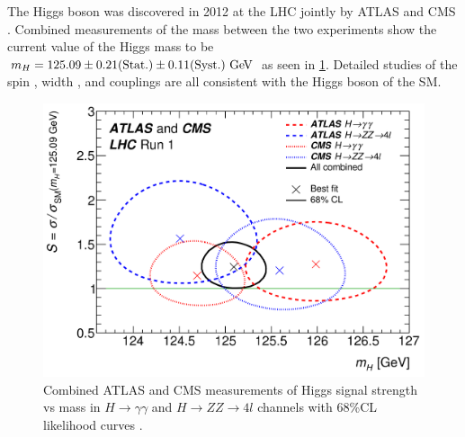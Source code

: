 

The Higgs boson was discovered in 2012 at the LHC
jointly by ATLAS \cite{Aad20121} and CMS \cite{Chatrchyan:2012xdj}.
Combined measurements of the mass between the two experiments 
show the current value of the Higgs mass to be 
$m_H = 125.09 \pm 0.21 (\textrm{Stat.}) \pm 0.11 (\textrm{Syst.})\GeV$
\cite{Aad:2015zhl} as seen in \fig\ref{fig:higgs_mass}.
Detailed studies of the spin \cite{Aad2013120,Khachatryan:2014kca},
width \cite{Aad:2015xua,Khachatryan:2014iha},
and couplings \cite{ATLAS-CONF-2015-044} are all consistent
with the Higgs boson of the SM.

\begin{figure}
\centering
\includegraphics[width=.8\textwidth]{figures/theory/higgs_mass.png}
\caption{Combined ATLAS and CMS 
measurements of Higgs signal strength
vs mass in $H\rightarrow \gamma \gamma$ and $H\rightarrow ZZ\rightarrow 4l$
channels with 68\%CL likelihood curves \cite{Aad:2015zhl}.}
\label{fig:higgs_mass}
\end{figure}


